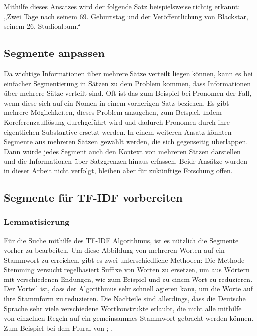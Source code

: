 Mithilfe dieses Ansatzes wird der folgende Satz beispielsweise richtig erkannt:
„Zwei Tage nach seinem 69. Geburtstag und der Veröffentlichung von Blackstar, seinem 26. Studioalbum.“


\subsection{Segmente anpassen}

Da wichtige Informationen über mehrere Sätze verteilt liegen können, kann es bei einfacher Segmentierung in Sätzen zu dem Problem kommen, dass Informationen über mehrere Sätze verteilt sind.
Oft ist das zum Beispiel bei Pronomen der Fall, wenn diese sich auf ein Nomen in einem vorherigen Satz beziehen.
Es gibt mehrere Möglichkeiten, dieses Problem anzugehen, zum Beispiel, indem Koreferenzauflösung durchgeführt wird und dadurch Pronomen durch ihre eigentlichen Substantive ersetzt werden.
In einem weiteren Ansatz könnten Segmente aus mehreren Sätzen gewählt werden, die sich gegenseitig überlappen.
Dann würde jedes Segment auch den Kontext von mehreren Sätzen darstellen und die Informationen über Satzgrenzen hinaus erfassen.
Beide Ansätze wurden in dieser Arbeit nicht verfolgt, bleiben aber für zukünftige Forschung offen.

\subsection{Segmente für TF-IDF vorbereiten}

\subsubsection{Lemmatisierung}

Für die Suche mithilfe des TF-IDF Algorithmus, ist es nützlich die Segmente vorher zu bearbeiten.
Um diese Abbildung von mehreren Worten auf ein Stammwort zu erreichen, gibt es zwei unterschiedliche Methoden:
Die Methode Stemming versucht regelbasiert Suffixe von Worten zu ersetzen, um aus Wörtern mit verschiedenen Endungen, wie zum Beispiel  und  zu einem Wort  zu reduzieren.
Der Vorteil ist, dass der Algorithmus sehr schnell agieren kann, um die Worte auf ihre Stammform zu reduzieren.
Die Nachteile sind allerdings, dass die Deutsche Sprache sehr viele verschiedene Wortkonstrukte erlaubt, die nicht alle mithilfe von einzelnen Regeln auf ein gemeinsammes Stammwort gebracht werden können. 
Zum Beispiel bei dem Plural von ; .


